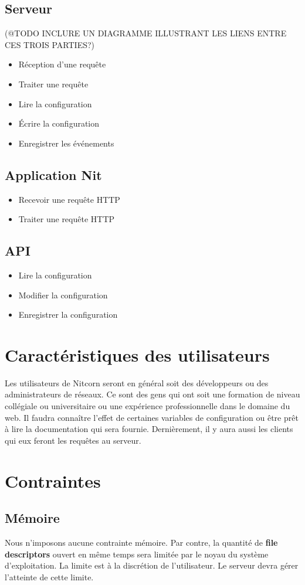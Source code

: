\documentclass{scrreprt}
\begin{document}
\subsection{Serveur}
(@TODO INCLURE UN DIAGRAMME ILLUSTRANT LES LIENS ENTRE CES TROIS PARTIES?)\\
\begin{itemize}
 \item Réception d'une requête
 \item Traiter une requête
 \item Lire la configuration
 \item Écrire la configuration
 \item Enregistrer les événements
\end{itemize}
\subsection{Application Nit}
\begin{itemize}
 \item Recevoir une requête HTTP
 \item Traiter une requête HTTP
\end{itemize}
\subsection{API}
\begin{itemize}
 \item Lire la configuration
 \item Modifier la configuration
 \item Enregistrer la configuration
\end{itemize}
\section{Caractéristiques des utilisateurs}
Les utilisateurs de Nitcorn seront en général soit des développeurs ou des
administrateurs de réseaux. Ce sont des gens qui ont soit une formation de
niveau collégiale ou universitaire ou une expérience professionnelle dans
le domaine du web. Il faudra connaître l'effet de certaines variables de
configuration ou être prêt à lire la documentation qui sera fournie.
Dernièrement, il y aura aussi les clients qui eux feront les requêtes
au serveur.
\section{Contraintes}

\subsection{Mémoire}
Nous n'imposons aucune contrainte mémoire. Par contre, la quantité de
\textbf{file descriptors} ouvert en même temps sera limitée par le noyau du
système d'exploitation. La limite est à la discrétion de l'utilisateur. Le
serveur devra gérer l'atteinte de cette limite.
\end{document}
